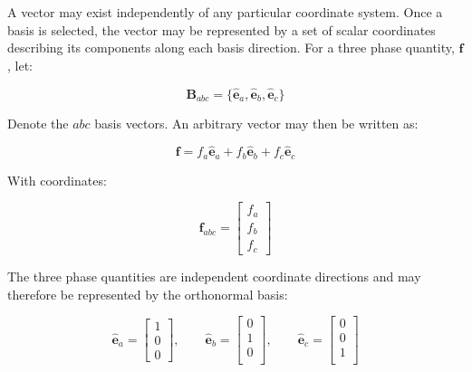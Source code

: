 \documentclass{article}
\begin{document}
A vector may exist independently of any particular coordinate system. Once a basis is selected, the vector may be represented by a set of scalar coordinates describing its components along each basis direction. For a three phase quantity, $\mathbf{f}$, let:

\begin{equation}
    \mathbf{B}_{abc} = \{ \mathbf{\hat{e}}_{a}, \mathbf{\hat{e}}_{b}, \mathbf{\hat{e}}_{c} \}
\end{equation}

Denote the $abc$ basis vectors. An arbitrary vector may then be written as:

\begin{equation}
    \mathbf{f} = f_a \mathbf{\hat{e}}_{a} + f_b \mathbf{\hat{e}}_{b} + f_c \mathbf{\hat{e}}_{c}
\end{equation}

With coordinates:

\begin{equation}
    \mathbf{f}_{abc} =
    \begin{bmatrix}
        f_a \\[1pt]
        f_b \\[1pt]
        f_c
    \end{bmatrix}
\end{equation}

The three phase quantities are independent coordinate directions and may therefore be represented by the orthonormal basis:

\begin{equation}
    \mathbf{\hat{e}}_a =
    \begin{bmatrix}
        1 \\[1pt]
        0 \\[1pt]
        0
    \end{bmatrix}, 
    \qquad
    \mathbf{\hat{e}}_b =
    \begin{bmatrix}
        0 \\[1pt]
        1 \\[1pt]
        0 \\[1pt]
    \end{bmatrix},
    \qquad
    \mathbf{\hat{e}}_c =
    \begin{bmatrix}
        0 \\[1pt]
        0 \\[1pt]
        1 \\[1pt]
    \end{bmatrix}
\end{equation}
\end{document}
